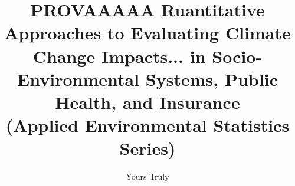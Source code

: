 \documentclass[krantz1,a4paper,11pt,ChapterTOCs,twoside,openright]{krantz}
\begin{document}
\frontmatter

\title{ PROVAAAAA Ruantitative Approaches to Evaluating Climate Change Impacts... 
in Socio-Environmental Systems, Public Health, and Insurance\\
{\Large(Applied Environmental Statistics Series)}
}
\author{Yours Truly}

\maketitle


\cleardoublepage
\setcounter{page}{7} %
\tableofcontents


%
% 

\mainmatter













\printindex
\end{document}
